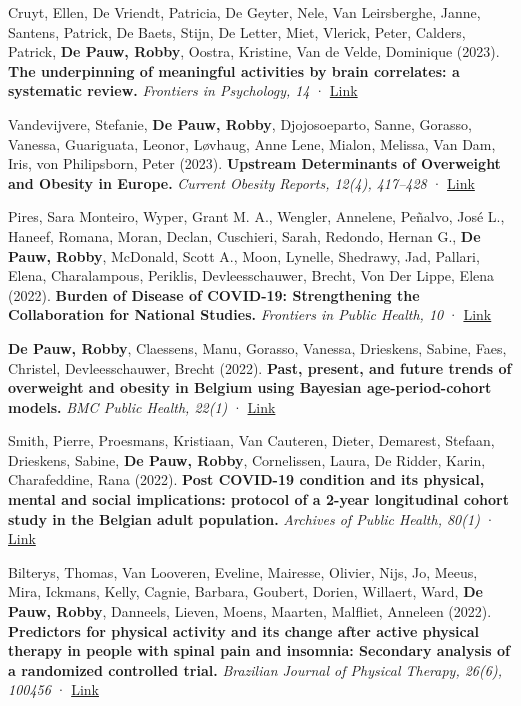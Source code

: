 \documentclass[
  letterpaper,
  DIV=11,
  numbers=noendperiod]{scrartcl}
\begin{document}
Cruyt, Ellen, De Vriendt, Patricia, De Geyter, Nele, Van Leirsberghe,
Janne, Santens, Patrick, De Baets, Stijn, De Letter, Miet, Vlerick,
Peter, Calders, Patrick, \textbf{De Pauw, Robby}, Oostra, Kristine, Van
de Velde, Dominique (2023). \textbf{The underpinning of meaningful
activities by brain correlates: a systematic review.} \emph{Frontiers in
Psychology, 14} ·
\href{http://dx.doi.org/10.3389/FPSYG.2023.1136754}{Link}

Vandevijvere, Stefanie, \textbf{De Pauw, Robby}, Djojosoeparto, Sanne,
Gorasso, Vanessa, Guariguata, Leonor, Løvhaug, Anne Lene, Mialon,
Melissa, Van Dam, Iris, von Philipsborn, Peter (2023). \textbf{Upstream
Determinants of Overweight and Obesity in Europe.} \emph{Current Obesity
Reports, 12(4), 417--428} ·
\href{http://dx.doi.org/10.1007/S13679-023-00524-1}{Link}

Pires, Sara Monteiro, Wyper, Grant M. A., Wengler, Annelene, Peñalvo,
José L., Haneef, Romana, Moran, Declan, Cuschieri, Sarah, Redondo,
Hernan G., \textbf{De Pauw, Robby}, McDonald, Scott A., Moon, Lynelle,
Shedrawy, Jad, Pallari, Elena, Charalampous, Periklis, Devleesschauwer,
Brecht, Von Der Lippe, Elena (2022). \textbf{Burden of Disease of
COVID-19: Strengthening the Collaboration for National Studies.}
\emph{Frontiers in Public Health, 10} ·
\href{http://dx.doi.org/10.3389/FPUBH.2022.907012}{Link}

\textbf{De Pauw, Robby}, Claessens, Manu, Gorasso, Vanessa, Drieskens,
Sabine, Faes, Christel, Devleesschauwer, Brecht (2022). \textbf{Past,
present, and future trends of overweight and obesity in Belgium using
Bayesian age-period-cohort models.} \emph{BMC Public Health, 22(1)} ·
\href{http://dx.doi.org/10.1186/S12889-022-13685-W}{Link}

Smith, Pierre, Proesmans, Kristiaan, Van Cauteren, Dieter, Demarest,
Stefaan, Drieskens, Sabine, \textbf{De Pauw, Robby}, Cornelissen, Laura,
De Ridder, Karin, Charafeddine, Rana (2022). \textbf{Post COVID-19
condition and its physical, mental and social implications: protocol of
a 2-year longitudinal cohort study in the Belgian adult population.}
\emph{Archives of Public Health, 80(1)} ·
\href{http://dx.doi.org/10.1186/S13690-022-00906-2}{Link}

Bilterys, Thomas, Van Looveren, Eveline, Mairesse, Olivier, Nijs, Jo,
Meeus, Mira, Ickmans, Kelly, Cagnie, Barbara, Goubert, Dorien, Willaert,
Ward, \textbf{De Pauw, Robby}, Danneels, Lieven, Moens, Maarten,
Malfliet, Anneleen (2022). \textbf{Predictors for physical activity and
its change after active physical therapy in people with spinal pain and
insomnia: Secondary analysis of a randomized controlled trial.}
\emph{Brazilian Journal of Physical Therapy, 26(6), 100456} ·
\href{http://dx.doi.org/10.1016/J.BJPT.2022.100456}{Link}
\end{document}
